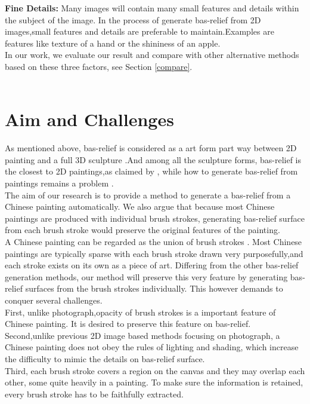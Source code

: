 \textbf{Fine Details:} Many images will contain many small features and details within the subject of the image. In the process of generate bas-relief from 2D images,small features and details are preferable to maintain.Examples are features like texture of a hand or the shininess of an apple. \\ 
In our work, we evaluate our result and compare with other alternative methods based on these three factors, see Section \ref{compare}. \\ \\ 

\section{Aim and Challenges}
As mentioned above, bas-relief is considered as a art form part way between 2D painting and a full 3D sculpture\cite{benzaid2017analysis}\cite{weyrich2007digital}\cite{kerber2009feature}\cite{kerber2012computer}\cite{zeng2014region} .And among all the sculpture forms, bas-relief is the closest to 2D paintings,as claimed by \cite{kerber2009feature} \cite{barron2012color}, while how to generate bas-relief from  paintings remains a problem .\\ 
The aim of our research is to provide a method to generate a bas-relief from a Chinese painting automatically. We also argue that because most Chinese paintings are produced with individual brush strokes, generating bas-relief surface from each brush stroke would preserve the original features of the painting.\\ 
A Chinese painting can be regarded as the union of brush strokes \cite{xu2006animating}. Most Chinese paintings are typically sparse with each brush stroke drawn very purposefully\cite{smith1997art},and each stroke exists on its own as a piece of art\cite{girshick2004simulating}.
Differing from the other bas-relief generation methods, our method will preserve this very feature by generating bas-relief surfaces from the brush strokes individually. 
This however demands to conquer several challenges.\\ 
First, unlike photograph,opacity of brush strokes is a important feature of Chinese painting. It is desired to preserve this feature on bas-relief.\\ Second,unlike previous 2D image based methods focusing on photograph, a Chinese painting does not obey the rules of lighting and shading, which increase the difficulty to mimic the details on bas-relief surface. \\Third, each brush stroke covers a region on the canvas and they may overlap each other, some quite heavily in a painting. To make sure the information is retained, every brush stroke has to be faithfully extracted. \\  \\

